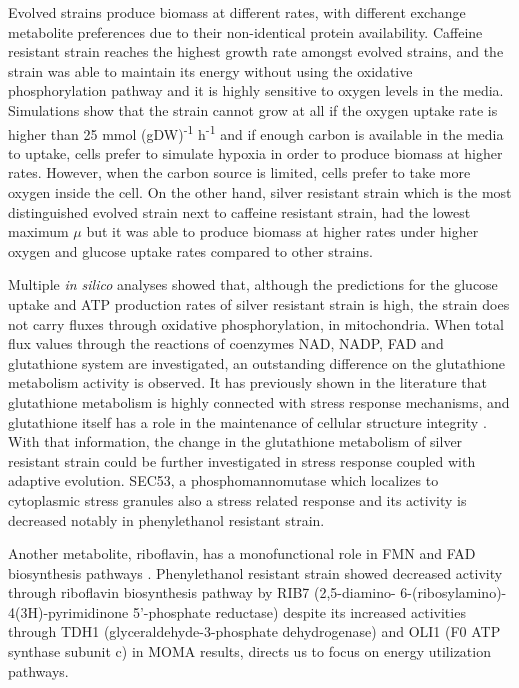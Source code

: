 Evolved strains produce biomass at different rates, with different exchange metabolite preferences due to their non-identical protein availability. Caffeine resistant strain reaches the highest growth rate amongst evolved strains, and the strain was able to maintain its energy without using the oxidative phosphorylation pathway and it is highly sensitive to oxygen levels in the media. Simulations show that the strain cannot grow at all if the oxygen uptake rate is higher than 25 mmol (gDW)\textsuperscript{-1} h\textsuperscript{-1} and if enough carbon is available in the media to uptake, cells prefer to simulate hypoxia in order to produce biomass at higher rates. However, when the carbon source is limited, cells prefer to take more oxygen inside the cell. On the other hand, silver resistant strain which is the most distinguished evolved strain next to caffeine resistant strain, had the lowest maximum $\mu$ but it was able to produce biomass at higher rates under higher oxygen and glucose uptake rates compared to other strains.

Multiple \emph{in silico} analyses showed that, although the predictions for the glucose uptake and ATP production rates of silver resistant strain is high, the strain does not carry fluxes through oxidative phosphorylation, in mitochondria. When total flux values through the reactions of coenzymes NAD, NADP, FAD and glutathione system are investigated, an outstanding difference on the glutathione metabolism activity is observed. It has previously shown in the literature that glutathione metabolism is highly connected with stress response mechanisms, and glutathione itself has a role in the maintenance of cellular structure integrity \cite{penninckx2002overview}. With that information, the change in the glutathione metabolism of silver resistant strain could be further investigated in stress response coupled with adaptive evolution. SEC53, a phosphomannomutase which localizes to cytoplasmic stress granules also a stress related response\cite{kepes1988yeast} and its activity is decreased notably in phenylethanol resistant strain.

Another metabolite, riboflavin, has a monofunctional role in FMN and FAD biosynthesis pathways \cite{oltmanns1972biosynthesis}. Phenylethanol resistant strain showed decreased activity through riboflavin biosynthesis pathway by RIB7 (2,5-diamino- 6-(ribosylamino)- 4(3H)-pyrimidinone 5'-phosphate reductase) despite its increased activities through TDH1 (glyceraldehyde-3-phosphate dehydrogenase) and OLI1 (F0 ATP synthase subunit c) in MOMA results, directs us to focus on energy utilization pathways.

